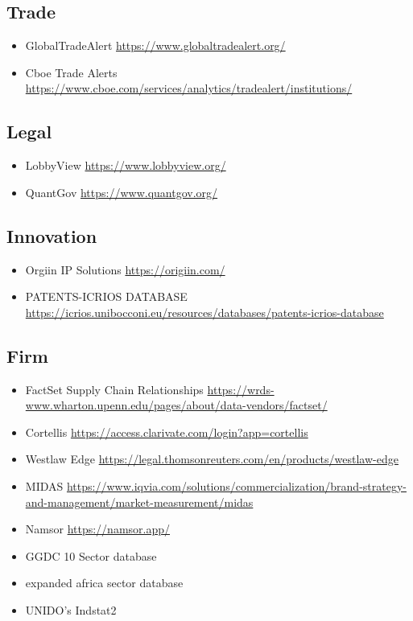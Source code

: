 \documentclass[10pt]{article} %
\begin{document}
    \subsection{Trade}
        \begin{itemize}
            \item GlobalTradeAlert \url{https://www.globaltradealert.org/}
            \item Cboe Trade Alerts \url{https://www.cboe.com/services/analytics/tradealert/institutions/}
        \end{itemize}

    \subsection{Legal}
        \begin{itemize}
        \item LobbyView \url{https://www.lobbyview.org/}
        \item QuantGov \url{https://www.quantgov.org/}
        \end{itemize}
    
    \subsection{Innovation}
        \begin{itemize}
            \item Orgiin IP Solutions \url{https://origiin.com/}
            \item PATENTS-ICRIOS DATABASE \url{https://icrios.unibocconi.eu/resources/databases/patents-icrios-database}
        \end{itemize}
    
    \subsection{Firm}
        \begin{itemize}
            \item FactSet Supply Chain Relationships \url{https://wrds-www.wharton.upenn.edu/pages/about/data-vendors/factset/}
            \item Cortellis \url{https://access.clarivate.com/login?app=cortellis}
            \item Westlaw Edge \url{https://legal.thomsonreuters.com/en/products/westlaw-edge}
            \item MIDAS \url{https://www.iqvia.com/solutions/commercialization/brand-strategy-and-management/market-measurement/midas}
            \item Namsor \url{https://namsor.app/}
            \item GGDC 10 Sector database
            \item expanded africa sector database
            \item UNIDO's Indstat2
        \end{itemize}
    
\end{document}
